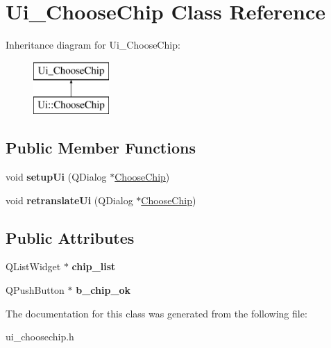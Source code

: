 \hypertarget{classUi__ChooseChip}{\section{Ui\-\_\-\-Choose\-Chip Class Reference}
\label{classUi__ChooseChip}
}
Inheritance diagram for Ui\-\_\-\-Choose\-Chip\-:\begin{figure}[H]
\begin{center}
\leavevmode
\includegraphics[height=2.000000cm]{classUi__ChooseChip}
\end{center}
\end{figure}
\subsection*{Public Member Functions}
\begin{DoxyCompactItemize}
\item 
\hypertarget{classUi__ChooseChip_a8b1b7532ad7acf8776500245b9ced193}{void {\bfseries setup\-Ui} (Q\-Dialog $\ast$\hyperlink{classChooseChip}{Choose\-Chip})}\label{classUi__ChooseChip_a8b1b7532ad7acf8776500245b9ced193}

\item 
\hypertarget{classUi__ChooseChip_a458d4ba1d1ed78eb156a08d030061841}{void {\bfseries retranslate\-Ui} (Q\-Dialog $\ast$\hyperlink{classChooseChip}{Choose\-Chip})}\label{classUi__ChooseChip_a458d4ba1d1ed78eb156a08d030061841}

\end{DoxyCompactItemize}
\subsection*{Public Attributes}
\begin{DoxyCompactItemize}
\item 
\hypertarget{classUi__ChooseChip_a855422798025d2b9f9c61d20cc243c33}{Q\-List\-Widget $\ast$ {\bfseries chip\-\_\-list}}\label{classUi__ChooseChip_a855422798025d2b9f9c61d20cc243c33}

\item 
\hypertarget{classUi__ChooseChip_a271aa8a7a94ba1d6e0e45a4c8b0dcdbd}{Q\-Push\-Button $\ast$ {\bfseries b\-\_\-chip\-\_\-ok}}\label{classUi__ChooseChip_a271aa8a7a94ba1d6e0e45a4c8b0dcdbd}

\end{DoxyCompactItemize}


The documentation for this class was generated from the following file\-:\begin{DoxyCompactItemize}
\item 
ui\-\_\-choosechip.\-h\end{DoxyCompactItemize}
